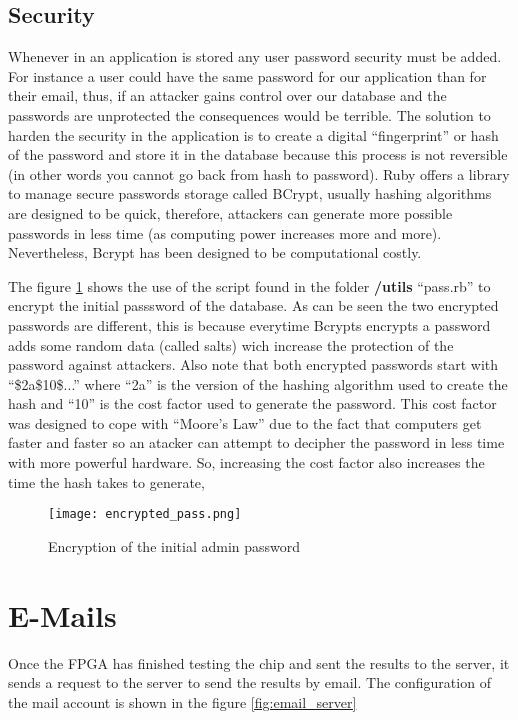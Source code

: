 \subsection{Security}

Whenever in an application is stored any user password security must be added. For instance a user could have the same password for our application than for their email, thus, if an attacker gains control over our database and the passwords are unprotected the consequences would be
terrible. The solution to harden the security in the application is to create a digital ``fingerprint'' or hash of the password and store it in the database because this process is not reversible (in other words you cannot go back from hash to password). 
Ruby offers a library to manage secure passwords storage called BCrypt, usually hashing algorithms are designed to be quick, therefore, attackers can generate more possible passwords in less time (as computing power increases more and more). Nevertheless, Bcrypt has been designed to 
be computational costly. 

The figure \ref{fig:initial_pass} shows the use of the script found in the folder {\bf /utils} ``pass.rb'' to encrypt the initial passsword of the database. As can be seen the two encrypted passwords are different, this is because everytime Bcrypts encrypts a password adds some random data 
(called salts) wich increase the protection of the password against attackers. Also note that both encrypted passwords start with ``\$2a\$10\$...'' where ``2a'' is the version of the hashing algorithm used to create the hash and ``10'' is the cost factor used to generate the password. This cost factor
was designed to cope with ``Moore's Law'' due to the fact that computers get faster and faster so an atacker can attempt to decipher the password in less time with more powerful hardware. So, increasing the cost factor also increases the time the hash takes to generate,   

\begin{figure}[htb]
\centering
\texttt{[image: encrypted\_pass.png]}
\caption{Encryption of the initial admin password}
\label{fig:initial_pass}
\end{figure}


\section{E-Mails}

Once the FPGA has finished testing the chip and sent the results to the server, it sends a request to the server to send the results by email. The configuration of the mail account is shown in the figure \ref{fig:email_server}

